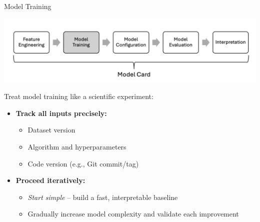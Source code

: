 \documentclass[10pt,compress,t,notes=noshow, xcolor=table]{beamer}
\begin{document}
\begin{frame}[t]{Model Training}
\label{model-training}

\includegraphics[width=\linewidth, trim=0 60 0 0, clip]{figure_man/Modelling3.png}

\vspace{0.5em}
Treat model training like a scientific experiment:
\begin{itemize}
  \item \textbf{Track all inputs precisely:}
    \begin{itemize}
      \item Dataset version
      \item Algorithm and hyperparameters
      \item Code version (e.g., Git commit/tag)
    \end{itemize}
  \item \textbf{Proceed iteratively:}
    \begin{itemize}
      \item \emph{Start simple} – build a fast, interpretable baseline
      \item Gradually increase model complexity and validate each improvement
    \end{itemize}
\end{itemize}
\end{frame}

\end{document}
